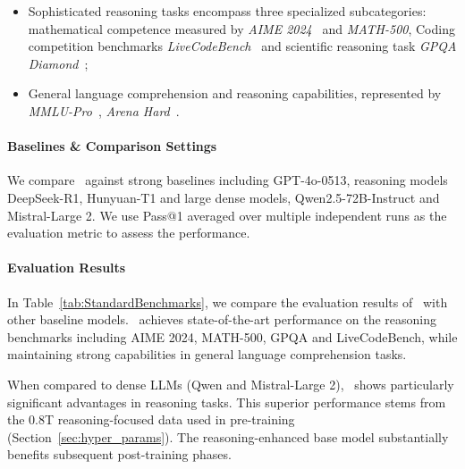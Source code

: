 \begin{itemize}[leftmargin=*]
\item Sophisticated reasoning tasks encompass three specialized subcategories: mathematical competence measured by \textit{AIME 2024}~\cite{MAA} and \textit{MATH-500}, Coding competition benchmarks \textit{LiveCodeBench}~\cite{jain2024livecodebench} and scientific reasoning task \textit{GPQA Diamond}~\cite{rein2024gpqa};
\item General language comprehension and reasoning capabilities, represented by \textit{MMLU-Pro}~\cite{gema2024we}, \textit{Arena Hard}~\cite{arenahard2024}.
\end{itemize}


\paragraph{Baselines \& Comparison Settings} We compare \modelname~against strong baselines including GPT-4o-0513, reasoning models DeepSeek-R1, Hunyuan-T1 and large dense models, Qwen2.5-72B-Instruct and Mistral-Large 2. 
We use Pass@1  averaged over multiple independent runs as the evaluation metric to assess the performance.

\paragraph{Evaluation Results}
In Table~\ref{tab:StandardBenchmarks}, we compare the evaluation results of \modelname~with other baseline models. \modelname~achieves state-of-the-art performance on the reasoning benchmarks including AIME 2024, MATH-500, GPQA and LiveCodeBench, while maintaining strong capabilities in general language comprehension tasks.

When compared to dense LLMs (Qwen and Mistral-Large 2), \modelname~shows particularly significant advantages in reasoning tasks. This superior performance stems from the 0.8T reasoning-focused data used in pre-training (Section~\ref{sec:hyper_params}). The reasoning-enhanced base model substantially benefits subsequent post-training phases.



